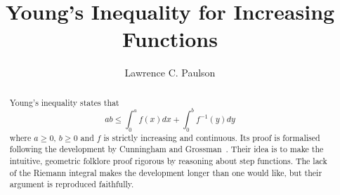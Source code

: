 \documentclass[11pt,a4paper]{article}
\begin{document}
\title{Young's Inequality for Increasing Functions}
\author{Lawrence C. Paulson}
\maketitle

\begin{abstract}
Young's inequality states that
$$ ab \leq \int_0^a f(x)dx + \int_0^b f^{-1}(y) dy $$
where $a\geq 0$, $b\geq 0$ and $f$ is strictly increasing and continuous.
Its proof is formalised following the development by Cunningham and Grossman~\cite{cunningham-youngs}.
Their idea is to make the intuitive, geometric folklore proof rigorous by reasoning about step functions.
The lack of the Riemann integral makes the development longer than one would like, but their argument is reproduced faithfully.
\end{abstract}

\newpage
\tableofcontents
\newpage





\end{document}
